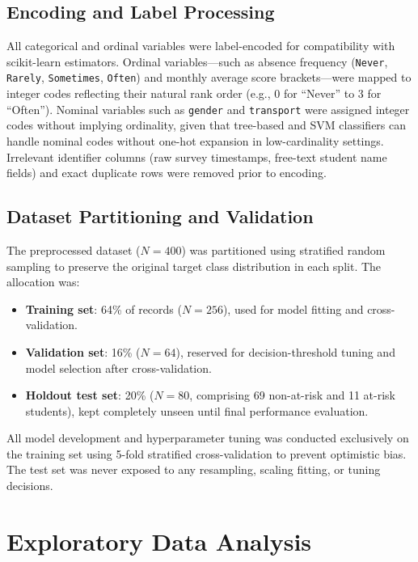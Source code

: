 \subsection{Encoding and Label Processing}
All categorical and ordinal variables were label-encoded for compatibility with scikit-learn estimators. Ordinal variables---such as absence frequency (\texttt{Never}, \texttt{Rarely}, \texttt{Sometimes}, \texttt{Often}) and monthly average score brackets---were mapped to integer codes reflecting their natural rank order (e.g., 0 for ``Never'' to 3 for ``Often''). Nominal variables such as \texttt{gender} and \texttt{transport} were assigned integer codes without implying ordinality, given that tree-based and SVM classifiers can handle nominal codes without one-hot expansion in low-cardinality settings. Irrelevant identifier columns (raw survey timestamps, free-text student name fields) and exact duplicate rows were removed prior to encoding.

\subsection{Dataset Partitioning and Validation}
The preprocessed dataset ($N=400$) was partitioned using stratified random sampling to preserve the original target class distribution in each split. The allocation was:
\begin{itemize}
    \item \textbf{Training set}: 64\% of records ($N=256$), used for model fitting and cross-validation.
    \item \textbf{Validation set}: 16\% ($N=64$), reserved for decision-threshold tuning and model selection after cross-validation.
    \item \textbf{Holdout test set}: 20\% ($N=80$, comprising 69 non-at-risk and 11 at-risk students), kept completely unseen until final performance evaluation.
\end{itemize}

All model development and hyperparameter tuning was conducted exclusively on the training set using 5-fold stratified cross-validation to prevent optimistic bias. The test set was never exposed to any resampling, scaling fitting, or tuning decisions.

\section{Exploratory Data Analysis}
\label{sec:eda}

